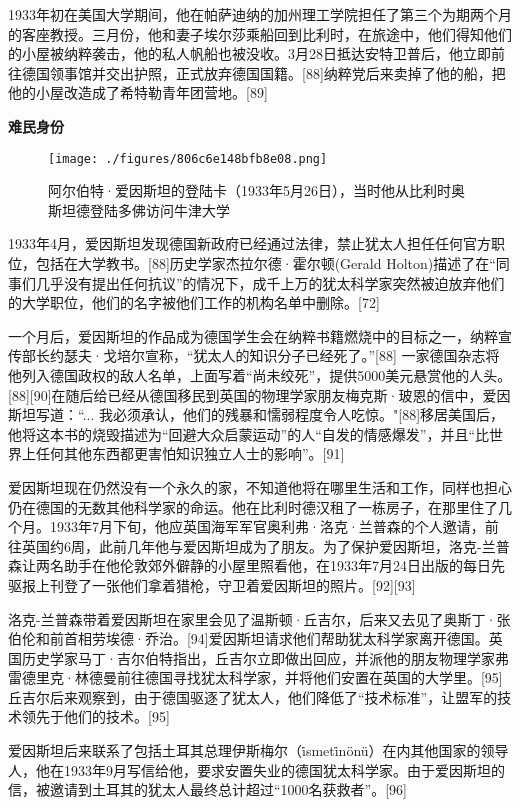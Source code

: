 1933年初在美国大学期间，他在帕萨迪纳的加州理工学院担任了第三个为期两个月的客座教授。三月份，他和妻子埃尔莎乘船回到比利时，在旅途中，他们得知他们的小屋被纳粹袭击，他的私人帆船也被没收。3月28日抵达安特卫普后，他立即前往德国领事馆并交出护照，正式放弃德国国籍。[88]纳粹党后来卖掉了他的船，把他的小屋改造成了希特勒青年团营地。[89]

\textbf{难民身份}

\begin{figure}[ht]
\centering
\texttt{[image: ./figures/806c6e148bfb8e08.png]}
\caption{阿尔伯特·爱因斯坦的登陆卡（1933年5月26日），当时他从比利时奥斯坦德登陆多佛访问牛津大学} \label{fig_AYST_11}
\end{figure}
1933年4月，爱因斯坦发现德国新政府已经通过法律，禁止犹太人担任任何官方职位，包括在大学教书。[88]历史学家杰拉尔德·霍尔顿(Gerald Holton)描述了在“同事们几乎没有提出任何抗议”的情况下，成千上万的犹太科学家突然被迫放弃他们的大学职位，他们的名字被他们工作的机构名单中删除。[72]

一个月后，爱因斯坦的作品成为德国学生会在纳粹书籍燃烧中的目标之一，纳粹宣传部长约瑟夫·戈培尔宣称，“犹太人的知识分子已经死了。”[88] 一家德国杂志将他列入德国政权的敌人名单，上面写着“尚未绞死”，提供5000美元悬赏他的人头。[88][90]在随后给已经从德国移民到英国的物理学家朋友梅克斯·玻恩的信中，爱因斯坦写道：“... 我必须承认，他们的残暴和懦弱程度令人吃惊。"[88]移居美国后，他将这本书的烧毁描述为“回避大众启蒙运动”的人“自发的情感爆发”，并且“比世界上任何其他东西都更害怕知识独立人士的影响”。[91]

爱因斯坦现在仍然没有一个永久的家，不知道他将在哪里生活和工作，同样也担心仍在德国的无数其他科学家的命运。他在比利时德汉租了一栋房子，在那里住了几个月。1933年7月下旬，他应英国海军军官奥利弗·洛克·兰普森的个人邀请，前往英国约6周，此前几年他与爱因斯坦成为了朋友。为了保护爱因斯坦，洛克-兰普森让两名助手在他伦敦郊外僻静的小屋里照看他，在1933年7月24日出版的每日先驱报上刊登了一张他们拿着猎枪，守卫着爱因斯坦的照片。[92][93]

洛克-兰普森带着爱因斯坦在家里会见了温斯顿·丘吉尔，后来又去见了奥斯丁·张伯伦和前首相劳埃德·乔治。[94]爱因斯坦请求他们帮助犹太科学家离开德国。英国历史学家马丁·吉尔伯特指出，丘吉尔立即做出回应，并派他的朋友物理学家弗雷德里克·林德曼前往德国寻找犹太科学家，并将他们安置在英国的大学里。[95]丘吉尔后来观察到，由于德国驱逐了犹太人，他们降低了“技术标准”，让盟军的技术领先于他们的技术。[95]

爱因斯坦后来联系了包括土耳其总理伊斯梅尔（i̇smeti̇nönü）在内其他国家的领导人，他在1933年9月写信给他，要求安置失业的德国犹太科学家。由于爱因斯坦的信，被邀请到土耳其的犹太人最终总计超过“1000名获救者”。[96]

